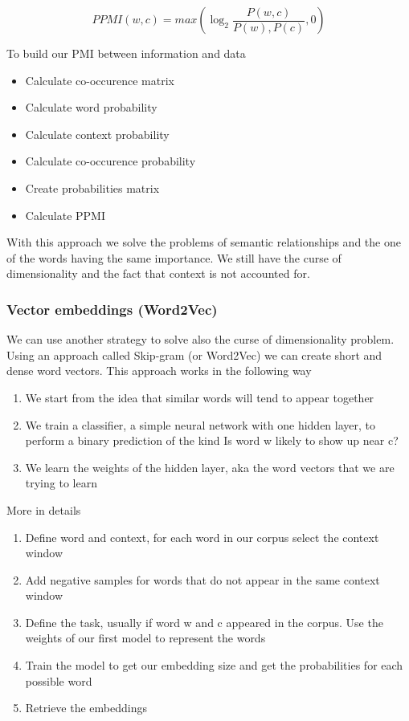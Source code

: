 \[
PPMI(w, c) = max(\log_2 \frac{P(w, c)}{P(w), P(c)}, 0 )
\]

To build our PMI between information and data

\begin{itemize}
    \item Calculate co-occurence matrix
    \item Calculate word probability
    \item Calculate context probability
    \item Calculate co-occurence probability
    \item Create probabilities matrix
    \item Calculate PPMI
\end{itemize}

With this approach we solve the problems of semantic relationships and the one of the words having the same importance. We still have the curse of dimensionality and the fact that context is not accounted for.


\subsubsection{Vector embeddings (Word2Vec)}

We can use another strategy to solve also the curse of dimensionality problem. Using an approach called Skip-gram (or Word2Vec) we can create short and dense word vectors. This approach works in the following way

\begin{enumerate}
    \item We start from the idea that similar words will tend to appear together
    \item We train a classifier, a simple neural network with one hidden layer, to perform a binary prediction of the kind \ra Is word w likely to show up near c?
    \item We learn the weights of the hidden layer, aka the word vectors that we are trying to learn
\end{enumerate}

More in details
\begin{enumerate}
    \item Define word and context, for each word in our corpus select the context window
    \item Add negative samples for words that do not appear in the same context window
    \item Define the task, usually if word w and c appeared in the corpus. Use the weights of our first model to represent the words
    \item Train the model to get our embedding size and get the probabilities for each possible word
    \item Retrieve the embeddings
\end{enumerate}

